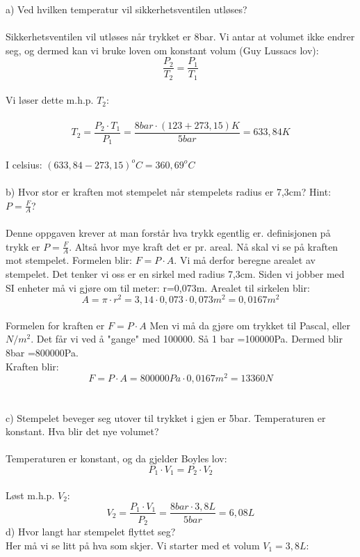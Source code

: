 \documentclass[12pt,a4paper]{article}
\begin{document}
a) Ved hvilken temperatur vil sikkerhetsventilen utløses?\\\\
Sikkerhetsventilen vil utløses når trykket er 8bar.  Vi antar at volumet ikke endrer seg, og  dermed kan vi bruke loven om konstant volum (Guy Lussacs lov):\\
$$\frac{P_2}{T_2}=\frac{P_1}{T_1}$$\\
Vi løser dette m.h.p. $T_2:$\\\\
$$T_2=\frac{P_2\cdot T_1}{P_1}=\frac{8bar\cdot (123+273,15)K}{5bar}=633,84K$$\\
I celsius:  $(633,84-273,15)^oC=360,69^oC$\\\\
b) Hvor stor er kraften mot stempelet når stempelets radius er 7,3cm? Hint: $P=\frac{F}{A}$?\\\\
Denne oppgaven krever at man forstår hva trykk egentlig er. definisjonen på trykk er $P=\frac{F}{A}$.  Altså hvor mye kraft det er pr. areal.  Nå skal vi se på kraften mot stempelet.  Formelen blir: $F=P\cdot A$. Vi må derfor beregne arealet av stempelet.  Det tenker vi oss er en sirkel med radius 7,3cm.  Siden vi jobber med SI enheter må vi gjøre om til meter: r=0,073m.  Arealet til sirkelen blir:\\
$$A=\pi\cdot r^2=3,14\cdot 0,073\cdot0,073m^2=0,0167m^2$$\\
Formelen for kraften er $F=P\cdot A$  Men vi må da gjøre om trykket til Pascal, eller $N/m^2$.  Det får vi ved å "gange" med 100000.  Så 1 bar =100000Pa. Dermed blir 8bar =800000Pa.\\
Kraften blir:\\
$$F=P\cdot A=800000Pa\cdot 0,0167m^2=13360N$$\\\\
c) Stempelet beveger seg utover til trykket i gjen er 5bar.  Temperaturen er konstant.  Hva blir det nye volumet?\\\\
Temperaturen er konstant, og da gjelder Boyles lov:\\
$$P_1\cdot V_1=P_2\cdot V_2$$\\
Løst m.h.p. $V_2$:\\
$$V_2=\frac{P_1\cdot V_1}{P_2}=\frac{8bar\cdot3,8L}{5bar}=6,08L$$ \newpage
d) Hvor langt har stempelet flyttet seg?\\
Her må vi se litt på hva som skjer.  Vi starter med et volum $V_1=3,8L$:\vspace{1.5cm}
\end{document}
